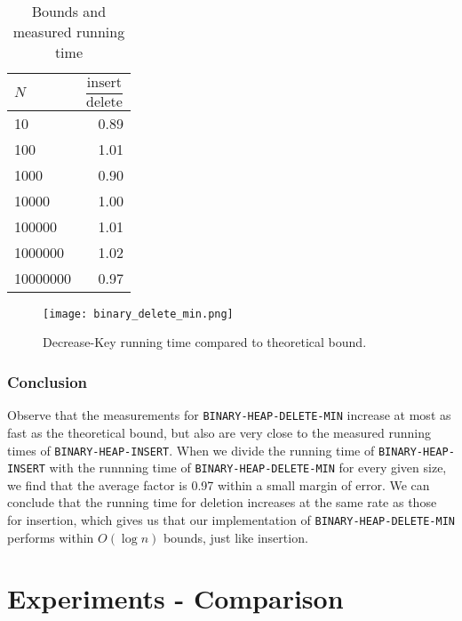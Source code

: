 \documentclass[a4paper,oneside,11pt]{article}
\begin{document}
\begin{table}
  \begin{center}
    \begin{tabular}{l|r}
      $N$ & $\dfrac{\text{insert}}{\text{delete}}$\\
      \hline
      10       & \num{0.89}\\
      100      & \num{1.01}\\
      1000     & \num{0.90}\\
      10000    & \num{1.00}\\
      100000   & \num{1.01}\\
      1000000  & \num{1.02}\\
      10000000 & \num{0.97}
    \end{tabular}
    \caption{Bounds and measured running time}
  \end{center}
\end{table}
\begin{figure}
    \texttt{[image: binary\_delete\_min.png]}
    \caption{Decrease-Key running time compared to theoretical bound.}
\end{figure}

\subsubsection*{Conclusion}
Observe that the measurements for \texttt{BINARY-HEAP-DELETE-MIN} increase at most as fast as the theoretical bound, but also are very close to the measured running times of \texttt{BINARY-HEAP-INSERT}. When we divide the running time of \texttt{BINARY-HEAP-INSERT} with the runnning time of \texttt{BINARY-HEAP-DELETE-MIN} for every given size, we find that the average factor is 0.97 within a small margin of error. We can conclude that the running time for deletion increases at the same rate as those for insertion, which gives us that our implementation of \texttt{BINARY-HEAP-DELETE-MIN} performs within $O(\log n)$ bounds, just like insertion.

\section*{Experiments - Comparison}
\end{document}
